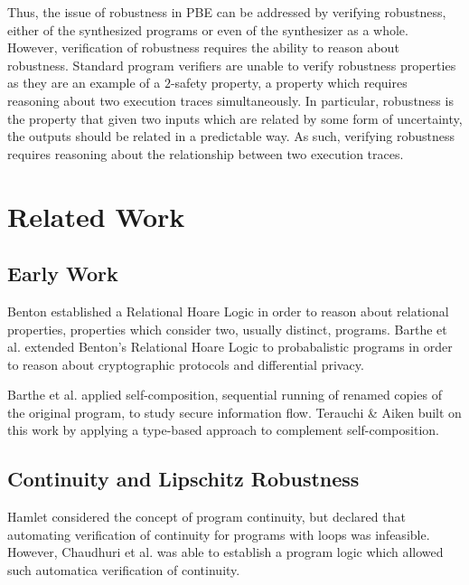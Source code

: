 \documentclass{llncs}
\begin{document}
Thus, the issue of robustness in PBE can be addressed by verifying robustness,
either of the synthesized programs or even of the synthesizer as a whole.
However, verification of robustness requires the ability to reason about
robustness.  Standard program verifiers are unable to verify robustness
properties as they are an example of a \(2\)-safety property, a property which
requires reasoning about two execution traces simultaneously.  In particular,
robustness is the property that given two inputs which are related by some form
of uncertainty, the outputs should be related in a predictable way.  As such,
verifying robustness requires reasoning about the relationship between two
execution traces.

\section{Related Work}

  \subsection{Early Work}
    \space\space Benton \cite{benton} established a
    Relational Hoare Logic in order to reason about relational properties,
    properties which consider two, usually distinct, programs.  Barthe et al.
    \cite{barthecrypto,bartheprivacy} extended Benton's Relational Hoare Logic to
    probabalistic programs in order to reason about cryptographic protocols and
    differential privacy.
    \smallskip

    \space\space Barthe et al.
    \cite{barthecomposition} applied self-composition, sequential running of renamed
    copies of the original program, to study secure information flow.  Terauchi \&
    Aiken \cite{terauchi05} built on this work by applying a type-based approach to
    complement self-composition.
    \smallskip

  \subsection{Continuity and Lipschitz Robustness}
    \space\space Hamlet \cite{hamlet02} considered the
    concept of program continuity, but declared that automating verification of
    continuity for programs with loops was infeasible.  However, Chaudhuri et al.
    \cite{chaudhuri10} was able to establish a program logic which allowed such
    automatica verification of continuity.
    \smallskip
\end{document}
